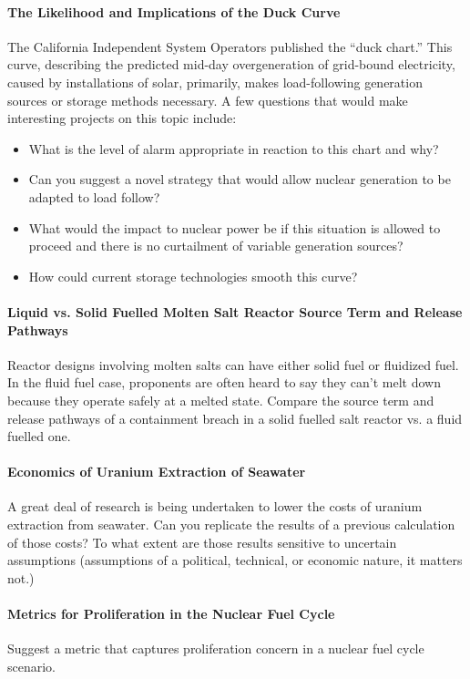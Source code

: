 \documentclass[12pts, answers]{exam}
\begin{document}
\paragraph{The Likelihood and Implications of the Duck Curve} The California
Independent System Operators published the ``duck chart.'' This curve,
describing the predicted mid-day overgeneration of grid-bound electricity,
caused by installations of solar, primarily, makes load-following generation
sources or storage methods necessary. A few questions that would make
interesting projects on this topic include:  
\begin{itemize}
\item What is the level of alarm appropriate in reaction to this chart and why? 
\item Can you suggest a novel strategy that would allow nuclear generation to
be adapted to load follow? 
\item What would the impact to nuclear power be if this situation is allowed to
proceed and there is no curtailment of variable generation sources? 
\item How could current storage technologies smooth this curve?
\end{itemize}

\paragraph{Liquid vs. Solid Fuelled Molten Salt Reactor Source Term and Release
Pathways} Reactor designs involving molten salts can have either solid fuel or
fluidized fuel. In the fluid fuel case, proponents are often heard to say they
can't melt down because they operate safely at a melted state. Compare the
source term and release pathways of a containment breach in a solid fuelled
salt reactor vs. a fluid fuelled one. 

\paragraph{Economics of Uranium Extraction of Seawater} A great deal of
research is being undertaken to lower the costs of uranium extraction from
seawater. Can you replicate the results of a previous calculation of those
costs? To what extent are those results sensitive to uncertain assumptions
(assumptions of a political, technical, or economic nature, it matters not.)

\paragraph{Metrics for Proliferation in the Nuclear Fuel Cycle} Suggest a
metric that captures proliferation concern in a nuclear fuel cycle scenario.
\end{document}
